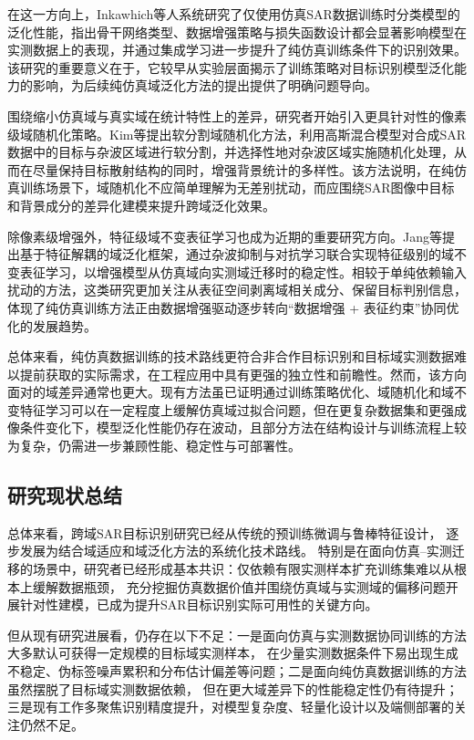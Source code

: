 在这一方向上，Inkawhich等人\cite{inkawhich2021bridging}系统研究了仅使用仿真SAR数据训练时分类模型的泛化性能，指出骨干网络类型、数据增强策略与损失函数设计都会显著影响模型在实测数据上的表现，并通过集成学习进一步提升了纯仿真训练条件下的识别效果。该研究的重要意义在于，它较早从实验层面揭示了训练策略对目标识别模型泛化能力的影响，为后续纯仿真域泛化方法的提出提供了明确问题导向。

围绕缩小仿真域与真实域在统计特性上的差异，研究者开始引入更具针对性的像素级域随机化策略。Kim等\cite{kim2024soft}提出软分割域随机化方法，利用高斯混合模型对合成SAR数据中的目标与杂波区域进行软分割，并选择性地对杂波区域实施随机化处理，从而在尽量保持目标散射结构的同时，增强背景统计的多样性。该方法说明，在纯仿真训练场景下，域随机化不应简单理解为无差别扰动，而应围绕SAR图像中目标和背景成分的差异化建模来提升跨域泛化效果。

除像素级增强外，特征级域不变表征学习也成为近期的重要研究方向。Jang等\cite{jang2025irasnet}提出基于特征解耦的域泛化框架，通过杂波抑制与对抗学习联合实现特征级别的域不变表征学习，以增强模型从仿真域向实测域迁移时的稳定性。相较于单纯依赖输入扰动的方法，这类研究更加关注从表征空间剥离域相关成分、保留目标判别信息，体现了纯仿真训练方法正由数据增强驱动逐步转向“数据增强 + 表征约束”协同优化的发展趋势。

总体来看，纯仿真数据训练的技术路线更符合非合作目标识别和目标域实测数据难以提前获取的实际需求，在工程应用中具有更强的独立性和前瞻性。然而，该方向面对的域差异通常也更大。现有方法虽已证明通过训练策略优化、域随机化和域不变特征学习可以在一定程度上缓解仿真域过拟合问题，但在更复杂数据集和更强成像条件变化下，模型泛化性能仍存在波动，且部分方法在结构设计与训练流程上较为复杂，仍需进一步兼顾性能、稳定性与可部署性。

\subsection{研究现状总结}
总体来看，跨域SAR目标识别研究已经从传统的预训练微调与鲁棒特征设计，
逐步发展为结合域适应和域泛化方法的系统化技术路线。
特别是在面向仿真--实测迁移的场景中，研究者已经形成基本共识：仅依赖有限实测样本扩充训练集难以从根本上缓解数据瓶颈，
充分挖掘仿真数据价值并围绕仿真域与实测域的偏移问题开展针对性建模，已成为提升SAR目标识别实际可用性的关键方向。

但从现有研究进展看，仍存在以下不足：一是面向仿真与实测数据协同训练的方法大多默认可获得一定规模的目标域实测样本，
在少量实测数据条件下易出现生成不稳定、伪标签噪声累积和分布估计偏差等问题；二是面向纯仿真数据训练的方法虽然摆脱了目标域实测数据依赖，
但在更大域差异下的性能稳定性仍有待提升；三是现有工作多聚焦识别精度提升，对模型复杂度、轻量化设计以及端侧部署的关注仍然不足。

